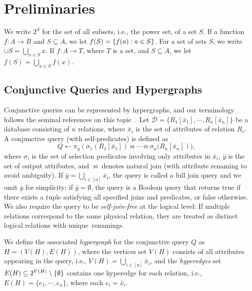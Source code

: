 \section{Preliminaries}\label{sec:preliminaries}

We write $2^S$ for the set of all subsets, i.e., the power set, of a set $S$. If a function $f : A \to B$ and $S \subseteq A$, we let $f(S) = \lbrace f(a) : a \in S \rbrace$. For a set of sets $S$, we write $\cup S = \bigcup_{x \in S} x$.  If $f : A \to T$, where $T$ is a set, and $S \subseteq A$, we let $f(S) = \bigcup_{x \in S} f(x)$.

\subsection{Conjunctive Queries and Hypergraphs}

Conjunctive queries can be represented by hypergraphs, and our terminology follows the seminal references on this topic~\cite{DBLP:journals/jcss/GottlobLS02,DBLP:journals/jcss/GottlobLS03,DBLP:conf/wg/GottlobGMSS05,DBLP:conf/pods/GottlobGLS16,wang_yannakakis_2025}.
Let $\mathcal{D} = \{R_1[\bar{x}_1], \cdots, R_n[\bar{x}_n]\}$ be a database consisting of $n$ relations, where $\bar{x}_i$ is the set of attributes of relation $R_i$. A conjunctive query (with self-predicates) is defined as 
\[
    Q \gets \pi_{\bar{y}}\left(\sigma_{1}(R_1[\bar{x}_1]) \Join \cdots \Join \sigma_{n}(R_n[\bar{x}_n]\right)),
\]
where $\sigma_{i}$ is the set of selection predicates involving only attributes in $\bar{x}_i$, $\bar{y}$ is the set of output attributes, and $\Join$ denotes natural join (with attribute renaming to avoid ambiguity). If $\bar{y} = \bigcup_{i \in [n]} \bar{x}_i$, the query is called a full join query and we omit $\bar{y}$ for simplicity; if $\bar{y} = \emptyset$, the query is a Boolean query that returns true if there exists a tuple satisfying all specified joins and predicates, or false otherwise.  We also require the query to be \emph{self-join-free} at the logical level:  If multiple relations correspond to the same physical relation, they are treated as distinct logical relations with unique~renamings.

We define the associated \emph{hypergraph} for the conjunctive query $Q$ as $H=(V(H), E(H))$, where the vertices set $V(H)$ consists of all attributes appearing in the query, i.e., $V(H) = \bigcup_{i \in [n]} \bar{x}_i$, and the \emph{hyperedges} set $E(H) \subseteq 2^{V(H)} \setminus \lbrace \emptyset \rbrace$ contains one hyperedge for each relation, i.e., $E(H) = \{e_1, \cdots, e_n\}$, where each $e_i = \bar{x}_i$.  

